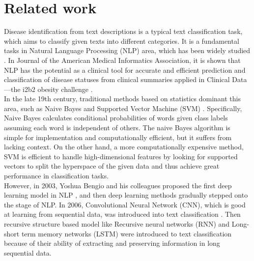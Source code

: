 \documentclass[11pt,a4paper]{article}
\begin{document}
\section{Related work}

Disease identification from text descriptions is a typical text classification task, which aims to classify given texts into different categories. It is a fundamental tasks in Natural Language Processing (NLP) area, which has been widely studied \cite{li2021survey}. In Journal of the American Medical Informatics Association, it is shown that NLP has the potential as a clinical tool for accurate and efficient prediction and classification of disease statuses from clinical summaries applied in Clinical Data—the i2b2 obesity challenge \cite{10.1197/jamia.M3096}.\\




\noindent In the late 19th century, traditional methods based on statistics dominant this area, such as Naive Bayes \cite{AutoIndex} and Supported Vector Machine (SVM) \cite{TextSVM}. Specifically, Naive Bayes calculates conditional probabilities of words given class labels assuming each word is independent of others. The naive Bayes algorithm is simple for implementation and computationally efficient, but it suffers from lacking context. On the other hand, a more computationally expensive method, SVM is efficient to handle high-dimensional features by looking for supported vectors to split the hyperspace of the given data and thus achieve great performance in classification tasks. \\

\noindent However, in 2003, Yoshua Bengio and his colleagues proposed the first deep learning model in NLP \cite{Bengio}, and then deep learning methods gradually stepped onto the stage of NLP. In 2006, Convolutional Neural Network (CNN), which is good at learning from sequential data, was introduced into text classification \cite{multitask}. Then recursive structure based model like Recursive neural networks (RNN) \cite{socher-etal-2013-recursive} and Long-short term memory networks (LSTM) were introduced to text classification because of their ability of extracting and preserving information in long sequential data. \\
\end{document}
